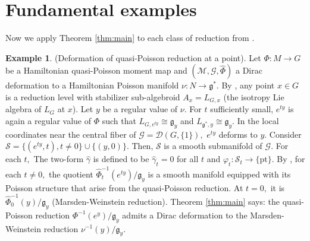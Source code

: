 \documentclass[reqno]{amsart}
\theoremstyle{plain}
\theoremstyle{definition}
\newtheorem{Exp}[Thm]{Example}
\newcommand{\G}{\mathcal{G}}
\newcommand{\g}{\mathfrak{g}}
\newcommand{\too}{\longrightarrow}
\renewcommand{\S}{\mathcal{S}}
\newcommand{\M}{\mathcal{M}}
\newcommand{\D}{\mathcal{D}}
\begin{document}
\section{Fundamental examples} \label{F example}
Now we apply Theorem \ref{thm:main} to each class of reduction from \cite[]{bualibanu2026reduction}.

\begin{Exp}(Deformation of quasi-Poisson reduction at a point). \label{conjugacy examp} \label{ex 5.1} Let $\Phi: M\too G$ be a Hamiltonian quasi-Poisson moment map and $(\M,\G,\widehat{\Phi})$ a Dirac deformation to a Hamiltonian Poisson manifold $\nu: N \too \g^*.$ By \cite[]{bualibanu2026reduction}, any point $x\in G$ is a reduction level with stabilizer sub-algebroid $A_x = L_{G,x}$ (the isotropy Lie algebra of $L_G$ at $x$). Let $y$ be a regular value of $\nu.$ For $t$ sufficiently small, $e^{ty}$ is again a regular value of $\Phi$ such that $L_{G,e^{ty}} \cong \g_y$ and $L_{\g^{*},y} \cong \g_y.$ In the local coordinates near the central fiber of $\G = \D(G,\{1\}),$ $e^{ty}$ deforms to $y.$ Consider $\S = \{(e^{ty},t), t\neq 0\} \cup \{(y,0)\}.$ Then, $\S$ is a smooth submanifold of $\G.$ For each $t,$ The two-form $\widehat{\gamma}$ is defined to be  $\widehat{\gamma}_t = 0$ for all $t$ and $\varphi_t:\S_t \too \{\text{pt}\}.$  By \cite[]{bualibanu2026reduction}, for each $t\neq 0,$ the quotient $\widehat{\Phi}_{t}^{-1}(e^{ty})/\g_y$ is a smooth manifold equipped with its Poisson structure that arise from the quasi-Poisson reduction. At $t = 0,$ it is $\widehat{\Phi}_{0}^{-1}(y)/\g_y$ (Marsden-Weinstein reduction). Theorem \ref{thm:main} says: the quasi-Poisson reduction $\Phi^{-1}(e^{y})/\g_y$ admits a Dirac deformation to the Marsden-Weinstein reduction $\nu^{-1}(y)/\g_y.$
\end{Exp}
\end{document}
